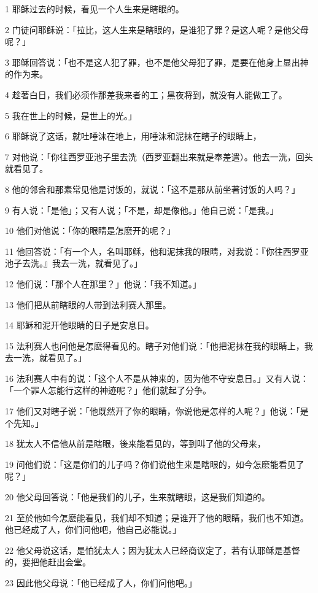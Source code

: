 \par 1 耶稣过去的时候，看见一个人生来是瞎眼的。
\par 2 门徒问耶稣说：「拉比，这人生来是瞎眼的，是谁犯了罪？是这人呢？是他父母呢？」
\par 3 耶稣回答说：「也不是这人犯了罪，也不是他父母犯了罪，是要在他身上显出神的作为来。
\par 4 趁著白日，我们必须作那差我来者的工；黑夜将到，就没有人能做工了。
\par 5 我在世上的时候，是世上的光。」
\par 6 耶稣说了这话，就吐唾沫在地上，用唾沫和泥抹在瞎子的眼睛上，
\par 7 对他说：「你往西罗亚池子里去洗（西罗亚翻出来就是奉差遣）。他去一洗，回头就看见了。
\par 8 他的邻舍和那素常见他是讨饭的，就说：「这不是那从前坐著讨饭的人吗？」
\par 9 有人说：「是他」；又有人说；「不是，却是像他。」他自己说：「是我。」
\par 10 他们对他说：「你的眼睛是怎麽开的呢？」
\par 11 他回答说：「有一个人，名叫耶稣，他和泥抹我的眼睛，对我说：『你往西罗亚池子去洗。』我去一洗，就看见了。」
\par 12 他们说：「那个人在那里？」他说：「我不知道。」
\par 13 他们把从前瞎眼的人带到法利赛人那里。
\par 14 耶稣和泥开他眼睛的日子是安息日。
\par 15 法利赛人也问他是怎麽得看见的。瞎子对他们说：「他把泥抹在我的眼睛上，我去一洗，就看见了。」
\par 16 法利赛人中有的说：「这个人不是从神来的，因为他不守安息日。」又有人说：「一个罪人怎能行这样的神迹呢？」他们就起了分争。
\par 17 他们又对瞎子说：「他既然开了你的眼睛，你说他是怎样的人呢？」他说：「是个先知。」
\par 18 犹太人不信他从前是瞎眼，後来能看见的，等到叫了他的父母来，
\par 19 问他们说：「这是你们的儿子吗？你们说他生来是瞎眼的，如今怎麽能看见了呢？」
\par 20 他父母回答说：「他是我们的儿子，生来就瞎眼，这是我们知道的。
\par 21 至於他如今怎麽能看见，我们却不知道；是谁开了他的眼睛，我们也不知道。他已经成了人，你们问他吧，他自己必能说。」
\par 22 他父母说这话，是怕犹太人；因为犹太人已经商议定了，若有认耶稣是基督的，要把他赶出会堂。
\par 23 因此他父母说：「他已经成了人，你们问他吧。」
